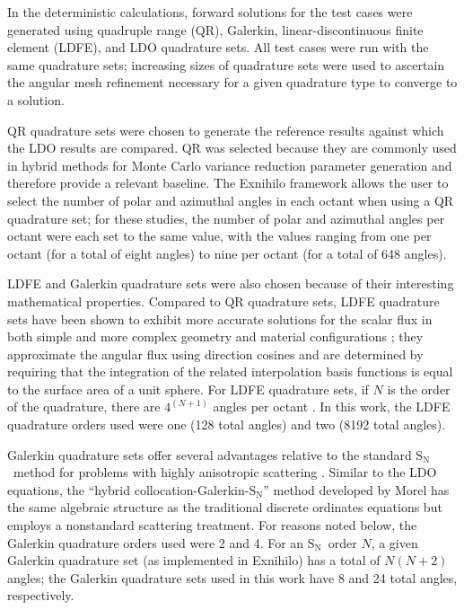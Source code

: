 \documentclass{article} %
\newcommand{\sn}{S$_\mathrm{N}$}
\begin{document}
In the deterministic calculations, forward solutions for the test cases were
generated using quadruple range (QR), Galerkin, linear-discontinuous finite 
element (LDFE), and LDO quadrature sets. All test cases were run with the same 
quadrature sets; increasing sizes of quadrature sets were used to ascertain the
angular mesh refinement necessary for a given quadrature type to converge to a 
solution. 

QR quadrature sets were chosen to generate the reference results against which
the  LDO results are compared. QR was selected because they are commonly used 
in hybrid methods for Monte Carlo variance reduction parameter generation and 
therefore provide a relevant baseline. The Exnihilo framework allows the user
to select the number of polar and azimuthal angles in each octant when using a
QR quadrature set; for these studies, the number of polar and azimuthal angles
per octant were each set to the same value, with the values ranging from one
per octant (for a total of eight angles) to nine per octant (for a total of
648 angles). 

LDFE and Galerkin quadrature sets were also chosen because of their interesting
mathematical properties. Compared to QR quadrature sets, LDFE quadrature sets
have been shown to exhibit more accurate solutions for the scalar flux in both 
simple and more complex geometry and material configurations \cite{ldfe}; they 
approximate the angular flux using direction cosines and are determined by
requiring that the integration of the related interpolation basis functions is
equal to the surface area of a unit sphere. For LDFE quadrature sets, if $N$ is
the order of the quadrature, there are $4^{(N+1)}$ angles per octant
\cite{exum}. In this work, the LDFE quadrature orders used were one (128 total
angles) and two (8192 total angles).

Galerkin quadrature sets offer several advantages relative to the standard \sn\
method for problems with highly anisotropic scattering \cite{morel}. Similar to
the LDO equations, the ``hybrid collocation-Galerkin-S$_\mathrm{N}$'' method
developed by Morel has the same algebraic structure as the traditional discrete
ordinates equations but employs a nonstandard scattering treatment.
For reasons noted below, the Galerkin quadrature orders used were 2 and 4. For
an \sn\ order $N$, a given Galerkin quadrature set (as implemented in Exnihilo)
has a total of $N(N+2)$ angles; the Galerkin quadrature sets
used in this work have 8 and 24 total angles, respectively.
\end{document}
